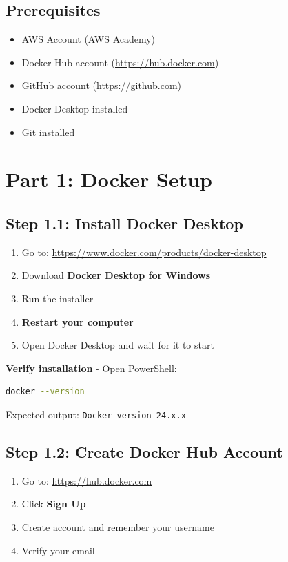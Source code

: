 \documentclass[12pt,a4paper]{article}
\begin{document}
\subsection{Prerequisites}

\begin{itemize}
    \item AWS Account (AWS Academy)
    \item Docker Hub account (\url{https://hub.docker.com})
    \item GitHub account (\url{https://github.com})
    \item Docker Desktop installed
    \item Git installed
\end{itemize}

\newpage

\section{Part 1: Docker Setup}

\subsection{Step 1.1: Install Docker Desktop}

\begin{enumerate}
    \item Go to: \url{https://www.docker.com/products/docker-desktop}
    \item Download \textbf{Docker Desktop for Windows}
    \item Run the installer
    \item \textbf{Restart your computer}
    \item Open Docker Desktop and wait for it to start
\end{enumerate}

\textbf{Verify installation} - Open PowerShell:
\begin{lstlisting}[language=bash]
docker --version
\end{lstlisting}

Expected output: \texttt{Docker version 24.x.x}

\subsection{Step 1.2: Create Docker Hub Account}

\begin{enumerate}
    \item Go to: \url{https://hub.docker.com}
    \item Click \textbf{Sign Up}
    \item Create account and remember your username
    \item Verify your email
\end{enumerate}
\end{document}

